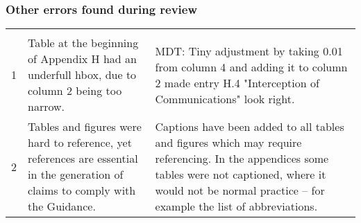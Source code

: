 \subsubsection{Other errors found during review}
%
\begin{longtable}[H]
{|L{}|L{}|L{}|}
\hline
{} &  & \\
\hline
  \endfirsthead
  \hline{} &  & \\\hline
  \endhead
  \endfoot
  \endlastfoot

  1&Table at the beginning of Appendix H had an underfull hbox, due to column 2 being too narrow.&MDT: Tiny adjustment by taking 0.01 from column 4 and adding it to column 2 made entry H.4 "Interception of Communications" look right.\\\hline
2&Tables and figures were hard to reference, yet references are essential in the generation of claims to comply with the Guidance.&Captions have been added to all tables and figures which may require referencing. In the appendices some tables were not captioned, where it would not be normal practice -- for example the list of abbreviations.\\\hline
\end{longtable}

\clearpage
